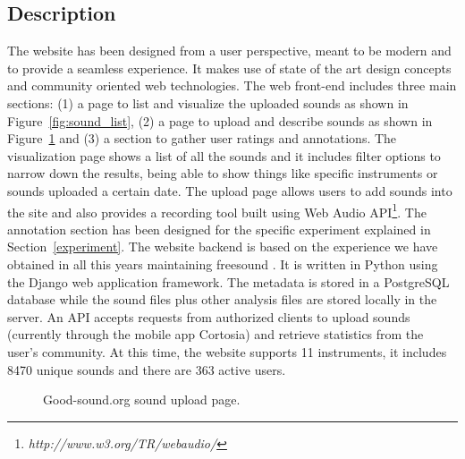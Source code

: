 \documentclass{article}
\begin{document}
\subsection{Description} 
The website has been designed from a user perspective, meant to be modern and to provide a seamless experience. It makes use of state of the art design concepts and community oriented web technologies. The web front-end includes three main sections: (1) a page to list and visua\-lize the uploaded sounds as shown in Figure~\ref{fig:sound_list}, (2) a page to upload and describe sounds as shown in Figure~\ref{fig:upload} and (3) a section to gather user ratings and annotations. The visualization page shows a list of all the sounds and it includes filter options to narrow down the results, being able to show things like specific instruments or sounds uploaded a certain date. The upload page allows users to add sounds into the site and also provides a recording tool built using Web Audio API\footnote{\textit{http://www.w3.org/TR/webaudio/}}. The annotation section has been designed for the specific experiment explained in Section~\ref{experiment}. 
The website backend is based on the experience we have obtained in all this years maintaining freesound\cite{2} . It is written in Python using the Django web application framework. The metadata is stored in a PostgreSQL database while the sound files plus other analysis files are stored locally in the server. An API accepts requests from authorized clients to upload sounds (currently through the mobile app Cortosia) and retrieve statistics from the user’s community. At this time, the website supports 11 instruments, it includes 8470 unique sounds and there are 363 active users. 

\begin{figure}
 \centerline{}
 \caption{Good-sound.org sound upload page.}
 \label{fig:upload}
\end{figure}
\end{document}

